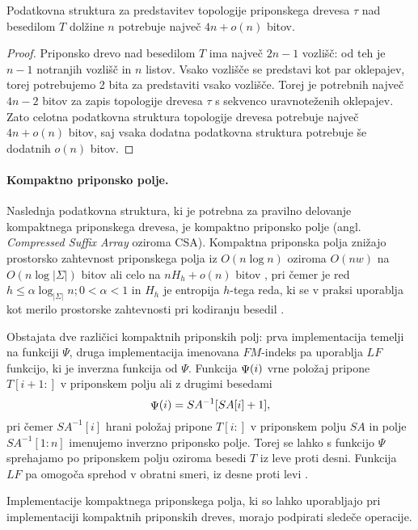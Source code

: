 \begin{lema}\label{lema:BP}
 Podatkovna struktura za predstavitev topologije priponskega drevesa $\tau$ nad besedilom $T$ dolžine $n$ potrebuje največ $4n+o(n)$ bitov.
\end{lema}

\begin{proof}
Priponsko drevo nad besedilom $T$ ima največ $2n-1$ vozlišč: od teh je $n-1$ notranjih vozlišč in $n$ listov. Vsako vozlišče se predstavi kot par oklepajev, torej potrebujemo 2 bita za predstaviti vsako vozlišče. Torej je potrebnih največ $4n-2$ bitov za zapis topologije drevesa $\tau$ s sekvenco uravnoteženih oklepajev. Zato celotna podatkovna struktura topologije drevesa potrebuje največ $4n+o(n)$ bitov, saj vsaka dodatna podatkovna struktura potrebuje še dodatnih $o(n)$ bitov.
\end{proof}

\paragraph{Kompaktno priponsko polje.}
Naslednja podatkovna struktura, ki je potrebna za pravilno delovanje kompaktnega priponskega drevesa, je kompaktno priponsko polje (angl. \textit{Compressed Suffix Array} oziroma CSA). Kompaktna priponska polja znižajo prostorsko zahtevnost priponskega polja iz $O(n\log{n})$ oziroma $O(nw)$ na $O(n\log{|\Sigma|})$ bitov \cite{Grossi2000} ali celo na $nH_h +o(n)$ bitov \cite{Grossi2003}, pri čemer je red $h\le\alpha\log_{|\Sigma|}{n};0<\alpha<1$ in $H_h$ je entropija $h$-tega reda, ki se v praksi uporablja kot merilo prostorske zahtevnosti pri kodiranju besedil \cite{Navarro2016}.

Obstajata dve različici kompaktnih priponskih polj: prva implementacija temelji na funkciji $\Psi$, druga implementacija imenovana $FM$-indeks pa uporablja $LF$ funkcijo, ki je inverzna funkcija od $\Psi$. Funkcija $ \mathop{\Psi}(i) $ vrne položaj pripone $T[i+1:]$ v priponskem polju ali z drugimi besedami
$$
     \mathop{\Psi}(i) =SA^{-1}[SA[i]+1],
$$
pri čemer $SA^{-1}[i]$ hrani položaj pripone $T[i:]$ v priponskem polju $SA$ in polje $SA^{-1}[1:n]$ imenujemo inverzno priponsko polje. Torej se lahko s funkcijo $\Psi$ sprehajamo po priponskem polju oziroma besedi $T$ iz leve proti desni. Funkcija $LF$ pa omogoča sprehod v obratni smeri, iz desne proti levi \cite{Navarro2016, Sadakane2007}.


Implementacije kompaktnega priponskega polja, ki so lahko uporabljajo pri implementaciji kompaktnih priponskih dreves, morajo podpirati sledeče operacije.

